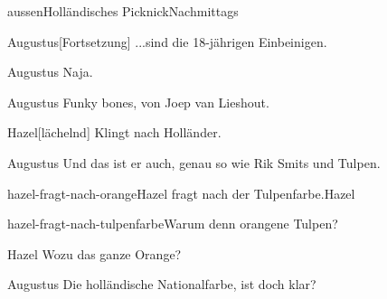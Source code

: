 \documentclass[12pt]{article}
\begin{document}
\begin{scene}{aussen}{Holländisches Picknick}{Nachmittags}

        \begin{dialog}{Augustus}[Fortsetzung]
            ...sind die 18-jährigen Einbeinigen.
        \end{dialog}


        \begin{dialog}{Augustus}
            Naja.
        \end{dialog}


        \begin{dialog}{Augustus}
            Funky bones, von Joep van Lieshout.
        \end{dialog}

        \begin{dialog}{Hazel}[lächelnd]
            Klingt nach Holländer.
        \end{dialog}

        \begin{dialog}{Augustus}
            Und das ist er auch, genau so wie Rik Smits und Tulpen.
        \end{dialog}


        \begin{decision}{hazel-fragt-nach-orange}{\gls{Hazel} fragt nach der Tulpenfarbe.}{Hazel}
            \begin{option}{hazel-fragt-nach-tulpenfarbe}{Warum denn orangene Tulpen?}
                \begin{dialog}{Hazel}
                    Wozu das ganze Orange?
                \end{dialog}

                \begin{dialog}{Augustus}
                    Die holländische Nationalfarbe, ist doch klar?
                \end{dialog}
            \end{option}


\end{decision}
\end{scene}
\end{document}
